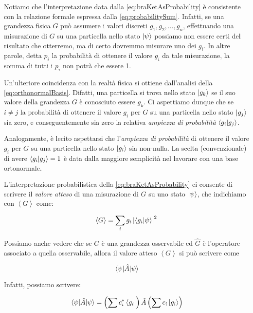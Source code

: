 Notiamo che l'interpretazione data dalla \eqref{eq:braKetAsProbability} \`e consistente con la relazione formale espressa dalla \eqref{eq:probabilitySum}. Infatti, se una grandezza fisica $G$ può assumere i valori discreti $g_1, g_2, ..., g_n$, effettuando una misurazione di $G$ su una particella nello stato $\ket{\psi}$ possiamo non essere certi del risultato che otterremo, ma di certo dovremmo misurare uno dei $g_i$. In altre parole, detta $p_i$ la probabilità di ottenere il valore $g_i$ da tale misurazione, la somma di tutti i $p_i$ non potrà che essere 1.

Un'ulteriore coincidenza con la realtà fisica si ottiene dall'analisi della \eqref{eq:orthonormalBasis}. Difatti, una particella si trova nello stato $\ket{g_k}$ se il suo valore della grandezza $G$ \`e conosciuto essere $g_k$. Ci aspettiamo dunque che se $i \neq j$ la probabilità di ottenere il valore $g_i$ per $G$ su una particella nello stato $\ket{g_j}$ sia zero, e conseguentemente sia zero la relativa \textit{ampiezza di probabilità} $\braket{g_i}{g_j}$.

Analogamente, \`e lecito aspettarsi che l'\textit{ampiezza di probabilità} di ottenere il valore $g_i$ per $G$ su una particella nello stato $\ket{g_i}$ sia non-nulla. La scelta (convenzionale) di avere $\braket{g_i}{g_j} = 1$ \`e data dalla maggiore semplicità nel lavorare con una base ortonormale.

L'interpretazione probabilistica della \eqref{eq:braKetAsProbability} ci consente di scrivere il \textit{valore atteso} di una misurazione di $G$ su uno stato $\ket{\psi}$, che indichiamo con $\left \langle G \right \rangle$ come:

	\begin{equation}
		\left \langle G \right \rangle = \sum_i g_i \left | \braket{g_i}{\psi} \right |^2
	\end{equation}

Possiamo anche vedere che se $G$ \`e una grandezza osservabile ed $\hat{G}$ \`e l'operatore associato a quella osservabile, allora il valore atteso $\left \langle G \right \rangle$ si può scrivere come

	\[
		\mel{\psi}{\hat{A}}{\psi}
	\]

Infatti, possiamo scrivere:

	\begin{equation}
		\mel{\psi}{\hat{A}}{\psi} = \left ( \sum c_i^* \bra{g_i} \right ) \hat{A} \left ( \sum c_i \ket{g_i} \right )
	\end{equation}

